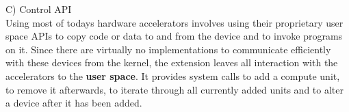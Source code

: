 \documentclass[a4paper,13pt]{article}
\begin{document}
\begin{multicols}{2}
C) Control API\\

Using most of todays hardware accelerators involves using their proprietary user space APIs to copy 
code or data to and from the device and to invoke programs on it. Since there are virtually no 
implementations to communicate efficiently with these devices from the kernel, the extension leaves 
all interaction with the accelerators to the {\bf user space}. It provides system calls to add a compute
unit, to remove it afterwards, to iterate through all currently added units and to alter a device 
after it has been added.
\end{multicols}
\vspace{20ex}
\end{document}
